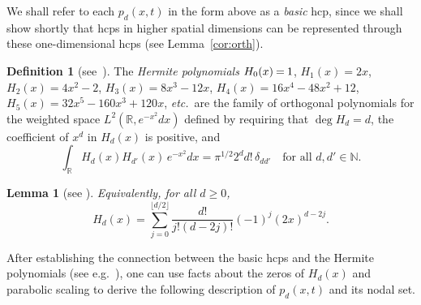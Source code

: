 \documentclass[10pt]{amsart}
\newtheorem{lemm}[theo]{Lemma}\newtheorem{prop}[theo]{Proposition}\newtheorem{coro}[theo]{Corollary}\newtheorem{conj}[theo]{Conjecture}
\theoremstyle{definition}\newtheorem{defi}[theo]{Definition}\newtheorem{rema}[theo]{Remark}\newtheorem{exam}[theo]{Example}\newtheorem{exem}[theo]{Example}\newtheorem{nota}[theo]{Notation}
\newcommand{\N}{\mathbb{N}}
\newcommand{\R}{\mathbb{R}}
\newcommand*{\mk}{\mkern -1mu}
\begin{document}
{We shall refer to each $p_d(x,t)$ in the form above as a \emph{basic} hcp, since we shall show shortly that hcps in higher spatial dimensions can be represented through these one-dimensional hcps (see Lemma~\ref{cor:orth}).}

\begin{defi}[{see~\cite[Section~5.5]{Szego75}}]
\!\! The \emph{Hermite polynomials} ${H_0(x)\mk=\mk 1}$, $H_1(x)=2x$, $H_2(x)=4x^2-2$, $H_3(x)=8x^3-12x$, $H_4(x)=16x^4-48x^2+12$, $H_5(x)=32x^5-160x^3+120x$, \emph{etc.}~are the family of orthogonal polynomials for the weighted space $L^2(\R,e^{-x^2}dx)$ defined by requiring that $\deg H_d=d$, the coefficient of $x^d$ in $H_d(x)$ is positive, and
\begin{equation}\label{H-def}
\int_{\R} H_{d}(x)H_{d'}(x)\,e^{-x^2}dx=\pi^{1/2}2^d d!\,\delta_{dd'}\quad\text{for all }d,d'\in\N.
\end{equation}
\end{defi}

\begin{lemm}[see {\cite[Section~5.5]{Szego75}}]
Equivalently, for all $d\geq 0$,
\begin{equation}\label{H-expansion}
H_d(x)=\sum_{j=0}^{\lfloor d/2\rfloor} \frac{d!}{j!(d-2j)!}(-1)^j(2x)^{d-2j}.
\end{equation}
\end{lemm}

After establishing the connection between the basic hcps and the Hermite polynomials (see e.g.~\cite{Chen98,KPS21,RW59}), one can use facts about the zeros of $H_d(x)$ and parabolic scaling to derive the following description of $p_d(x,t)$ and its nodal set.
\end{document}
